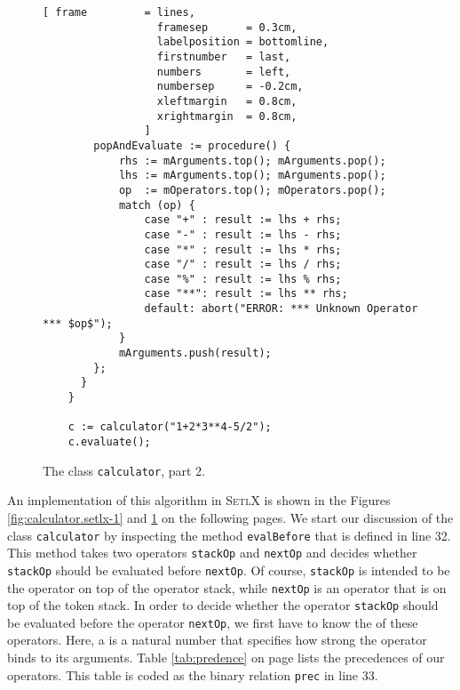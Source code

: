 \begin{figure}[!htb]
  \centering
\begin{Verbatim}[ frame         = lines, 
                  framesep      = 0.3cm, 
                  labelposition = bottomline,
                  firstnumber   = last,
                  numbers       = left,
                  numbersep     = -0.2cm,
                  xleftmargin   = 0.8cm,
                  xrightmargin  = 0.8cm,
                ]
        popAndEvaluate := procedure() {
            rhs := mArguments.top(); mArguments.pop();
            lhs := mArguments.top(); mArguments.pop();
            op  := mOperators.top(); mOperators.pop();
            match (op) {
                case "+" : result := lhs + rhs;
                case "-" : result := lhs - rhs;
                case "*" : result := lhs * rhs;
                case "/" : result := lhs / rhs;
                case "%" : result := lhs % rhs;
                case "**": result := lhs ** rhs;       
                default: abort("ERROR: *** Unknown Operator *** $op$");
            }
            mArguments.push(result);
        };    
      }
    }
    
    c := calculator("1+2*3**4-5/2");
    c.evaluate();
\end{Verbatim}
\vspace*{-0.3cm}
  \caption{The class \texttt{calculator}, part 2.}
  \label{fig:calculator.setlx-2}
\end{figure} 

\noindent
An implementation of this algorithm in \textsc{SetlX} is shown in the Figures
\ref{fig:calculator.setlx-1} and \ref{fig:calculator.setlx-2} on the following pages.
We start our discussion of the class \texttt{calculator} by inspecting the method
\texttt{evalBefore} that is defined in line 32.
This method takes two operators \texttt{stackOp} and \texttt{nextOp} and decides
whether \texttt{stackOp} should be evaluated before \texttt{nextOp}.  Of course, \texttt{stackOp} is
intended to be the operator on top of the operator stack, while \texttt{nextOp} is an operator that
is on top of the token stack.
In order to decide whether the operator \texttt{stackOp} should be evaluated before the operator
\texttt{nextOp},  we first have to know the  of these operators.  Here, a
 is a natural number that specifies how strong the operator binds to its
arguments. Table \ref{tab:predence} on page \pageref{tab:predence} lists the precedences of our
operators.  This table is coded as the binary relation \texttt{prec} in line 33.

